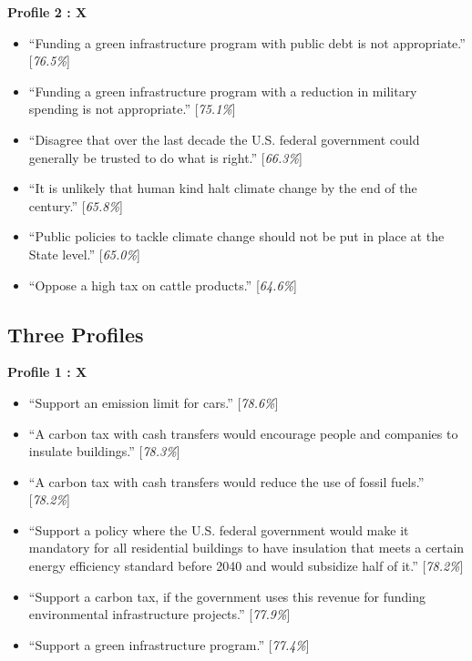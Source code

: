 \documentclass{article}
\begin{document}
\textbf{Profile 2 : X}
\begin{itemize}
   \item ``Funding a green infrastructure program with public debt is not appropriate.'' [\textit{76.5\%}]
   \item ``Funding a green infrastructure program with a reduction in military spending is not appropriate.'' [\textit{75.1\%}]
   \item ``Disagree that over the last decade the U.S. federal government could generally be trusted to do what is right.'' [\textit{66.3\%}]
   \item ``It is unlikely that human kind halt climate change by the end of the century.'' [\textit{65.8\%}]
   \item ``Public policies to tackle climate change should not be put in place at the State level.'' [\textit{65.0\%}]
   \item ``Oppose a high tax on cattle products.'' [\textit{64.6\%}]
\end{itemize}



\subsection{Three Profiles}

\textbf{Profile 1 : X}

\begin{itemize}
    \item ``Support an emission limit for cars.'' [\textit{78.6\%}] 
    \item ``A carbon tax with cash transfers would encourage people and companies to insulate buildings.'' [\textit{78.3\%}]
    \item ``A carbon tax with cash transfers would reduce the use of fossil fuels.'' [\textit{78.2\%}]
    \item ``Support a policy where the U.S. federal government would make it mandatory for all residential buildings to have insulation that meets a certain energy efficiency standard before 2040 and would subsidize half of it.'' [\textit{78.2\%}]
    \item ``Support a carbon tax, if the government uses this revenue for funding environmental infrastructure projects.'' [\textit{77.9\%}]
    \item ``Support a green infrastructure program.'' [\textit{77.4\%}]
\end{itemize}
\end{document}
